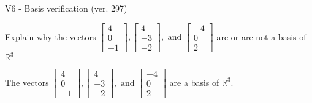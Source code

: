 \begin{exercise}
  \begin{exerciseTitle}V6 - Basis verification (ver. 297)\end{exerciseTitle}
  \begin{exerciseStatement}
    Explain why the vectors \(\left[\begin{array}{r}
4 \\
0 \\
-1
\end{array}\right] , \left[\begin{array}{r}
4 \\
-3 \\
-2
\end{array}\right] , \text{ and } \left[\begin{array}{r}
-4 \\
0 \\
2
\end{array}\right]\) are or are not a basis of \(\mathbb{R}^3\)	


  \end{exerciseStatement}
  \begin{exerciseAnswer}
   The vectors \(\left[\begin{array}{r}
4 \\
0 \\
-1
\end{array}\right] , \left[\begin{array}{r}
4 \\
-3 \\
-2
\end{array}\right] , \text{ and } \left[\begin{array}{r}
-4 \\
0 \\
2
\end{array}\right]\) 
  	 are  a basis of \(\mathbb{R}^3\).
  


  \end{exerciseAnswer}
\end{exercise}